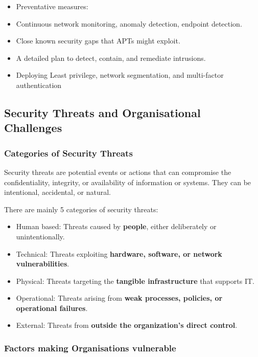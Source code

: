 \begin{itemize}
    \item Preventative measures:
    \item Continuous network monitoring, anomaly detection, endpoint detection.
    \item Close known security gaps that APTs might exploit.
    \item A detailed plan to detect, contain, and remediate intrusions.
    \item Deploying Least privilege, network segmentation, and multi-factor authentication
\end{itemize}

\subsection{Security Threats and Organisational Challenges}

\indent 

\subsubsection{Categories of Security Threats}

\indent 

Security threats are potential events or actions that can compromise the confidentiality, integrity, or availability of information or systems. They can be intentional, accidental, or natural.

There are mainly 5 categories of security threats:

\begin{itemize}
    \item Human based: Threats caused by \textbf{people}, either deliberately or unintentionally.
    \item Technical: Threats exploiting \textbf{hardware, software, or network vulnerabilities}.
    \item Physical: Threats targeting the \textbf{tangible infrastructure} that supports IT.
    \item Operational: Threats arising from \textbf{weak processes, policies, or operational failures}.
    \item External: Threats from \textbf{outside the organization’s direct control}.
\end{itemize}

\subsubsection{Factors making Organisations vulnerable}

